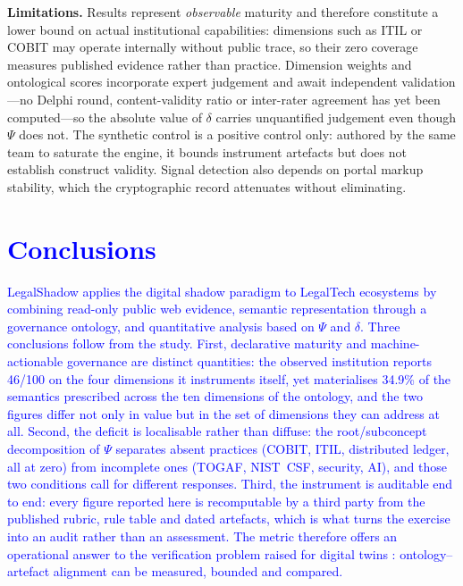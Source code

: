 \documentclass[engproc,proceedingpaper,submit,moreauthors]{Definitions/mdpi}
\begin{document}
\textbf{Limitations.}
    Results represent \emph{observable} maturity and therefore constitute a lower bound on actual institutional capabilities: dimensions such as ITIL or COBIT may operate internally without public trace, so their zero coverage measures published evidence rather than practice. Dimension weights and ontological scores incorporate expert judgement and await independent validation---no Delphi round, content-validity ratio \cite{Lawshe1975} or inter-rater agreement has yet been computed---so the absolute value of $\delta$ carries unquantified judgement even though $\Psi$ does not. The synthetic control is a positive control only: authored by the same team to saturate the engine, it bounds instrument artefacts but does not establish construct validity. Signal detection also depends on portal markup stability, which the cryptographic record attenuates without eliminating.

\section{\textcolor{blue}{Conclusions}}
\label{sec:conclusions}

    \textcolor{blue}{LegalShadow applies the digital shadow paradigm to LegalTech ecosystems by combining read-only public web evidence, semantic representation through a governance ontology, and quantitative analysis based on $\Psi$ and $\delta$. Three conclusions follow from the study. First, declarative maturity and machine-actionable governance are distinct quantities: the observed institution reports 46/100 on the four dimensions it instruments itself, yet materialises 34.9\% of the semantics prescribed across the ten dimensions of the ontology, and the two figures differ not only in value but in the set of dimensions they can address at all. Second, the deficit is localisable rather than diffuse: the root/subconcept decomposition of $\Psi$ separates absent practices (COBIT, ITIL, distributed ledger, all at zero) from incomplete ones (TOGAF, NIST~CSF, security, AI), and those two conditions call for different responses. Third, the instrument is auditable end to end: every figure reported here is recomputable by a third party from the published rubric, rule table and dated artefacts, which is what turns the exercise into an audit rather than an assessment. The metric therefore offers an operational answer to the verification problem raised for digital twins \cite{Karabulut2024}: ontology--artefact alignment can be measured, bounded and compared.}
\end{document}
